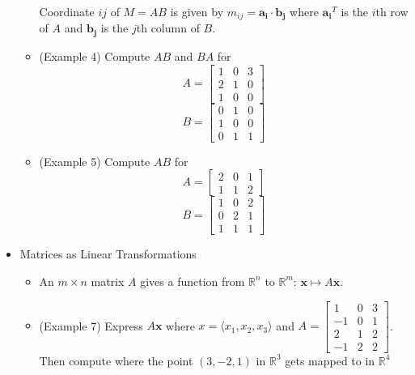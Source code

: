 \documentclass[11pt]{article}
\theoremstyle{plain}
\theoremstyle{definition}
\theoremstyle{remark}
\newcommand{\vect}[1]{\mathbf{#1}}
\newcommand{\<}{\langle}
\renewcommand{\>}{\rangle}
\begin{document}
\begin{itemize}
\begin{itemize}
        Coordinate \(ij\) of \(M=AB\) is given by
        \(m_{ij}=\vect{a_i}\cdot\vect{b_j}\)
        where \(\vect{a_i}^T\) is the \(i\)th row of \(A\)
        and \(\vect{b_j}\) is the \(j\)th column of \(B\).
      \item
        (Example 4) Compute \(AB\) and \(BA\) for
        \[
          A =
          \begin{bmatrix}
            1 & 0 & 3 \\
            2 & 1 & 0 \\
            1 & 0 & 0
          \end{bmatrix}
        \]
        \[
          B =
          \begin{bmatrix}
            0 & 1 & 0 \\
            1 & 0 & 0 \\
            0 & 1 & 1
          \end{bmatrix}
        \]
      \item
        (Example 5) Compute \(AB\) for
        \[
          A =
          \begin{bmatrix}
            2 & 0 & 1 \\
            1 & 1 & 2
          \end{bmatrix}
        \]
        \[
          B =
          \begin{bmatrix}
            1 & 0 & 2 \\
            0 & 2 & 1 \\
            1 & 1 & 1
          \end{bmatrix}
        \]
    \end{itemize}
  \item Matrices as Linear Transformations
    \begin{itemize}
      \item An \(m\times n\) matrix \(A\) gives a function from \(\mathbb R^n\)
            to \(\mathbb R^m\): \(\vect x \mapsto A\vect x\).
      \item (Example 7) Express \(A\vect x\) where \(x=\<x_1,x_2,x_3\>\) and
        \(
          A =
          \begin{bmatrix}
             1 &  0 &  3 \\
            -1 &  0 &  1 \\
             2 &  1 &  2 \\
            -1 &  2 &  2
          \end{bmatrix}
        \). Then compute where the point \((3,-2,1)\) in \(\mathbb R^3\) gets
        mapped to in \(\mathbb R^4\)

\end{itemize}
\end{itemize}
\end{document}
